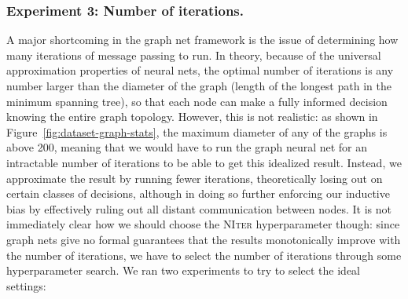 \subsubsection{Experiment 3: Number of iterations.}
A major shortcoming in the graph net framework is the issue of determining how many iterations of message passing to run.
In theory, because of the universal approximation properties of neural nets, the optimal number of iterations is any number larger than the diameter of the graph (length of the longest path in the minimum spanning tree), so that each node can make a fully informed decision knowing the entire graph topology.
However, this is not realistic: as shown in Figure~\ref{fig:dataset-graph-stats}, the maximum diameter of any of the graphs is above 200, meaning that we would have to run the graph neural net for an intractable number of iterations to be able to get this idealized result.
Instead, we approximate the result by running fewer iterations, theoretically losing out on certain classes of decisions, although in doing so further enforcing our inductive bias by effectively ruling out all distant communication between nodes.
It is not immediately clear how we should choose the \textsc{NIter} hyperparameter though: since graph nets give no formal guarantees that the results monotonically improve with the number of iterations, we have to select the number of iterations through some hyperparameter search.
We ran two experiments to try to select the ideal settings:
